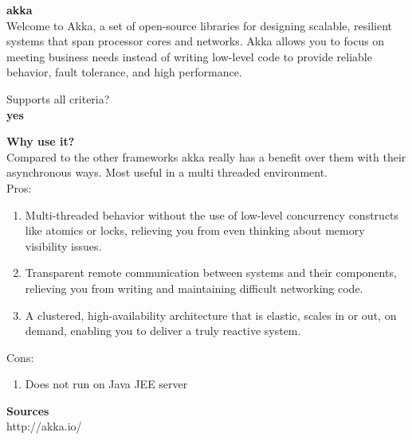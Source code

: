 
		\textbf{akka} \\
		Welcome to Akka, a set of open-source libraries for designing scalable, resilient systems that span processor cores and networks. Akka allows you to focus on meeting business needs instead of writing low-level code to provide reliable behavior, fault tolerance, and high performance.
		
		Supports all criteria?\\
		\textbf{yes}
		
	 	\textbf{Why use it?} \\
		Compared to the other frameworks akka really has a benefit over them with their asynchronous ways. Most useful in a multi threaded environment.\\
		
		
		Pros:
		\begin{enumerate}
			\item Multi-threaded behavior without the use of low-level concurrency constructs like atomics or locks, relieving you from even thinking about memory visibility issues.
			\item Transparent remote communication between systems and their components, relieving you from writing and maintaining difficult networking code.
			\item A clustered, high-availability architecture that is elastic, scales in or out, on demand, enabling you to deliver a truly reactive system.
		\end{enumerate}
		Cons:
		\begin{enumerate}
			\item Does not run on Java JEE server
		\end{enumerate}
	
	\textbf{Sources}\\
	http://akka.io/